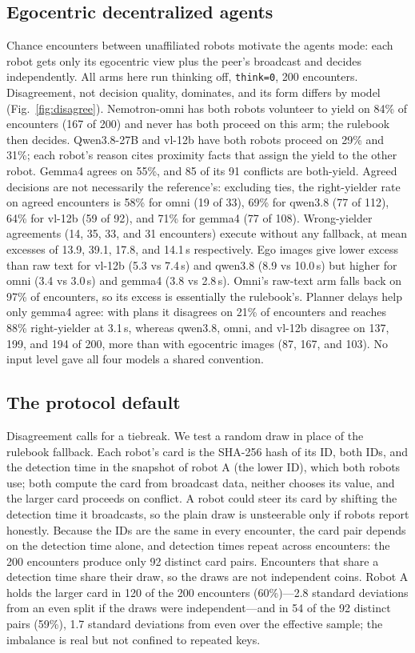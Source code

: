\documentclass[journal]{IEEEtran}
\begin{document}
\subsection{Egocentric decentralized agents}
\label{sec:ego}
Chance encounters between unaffiliated robots motivate the agents mode: each robot gets only its egocentric view plus the peer's broadcast and decides independently. All arms here run thinking off, \texttt{think=0}, 200 encounters. Disagreement, not decision quality, dominates, and its form differs by model (Fig.~\ref{fig:disagree}). Nemotron-omni has both robots volunteer to yield on 84\% of encounters (167 of 200) and never has both proceed on this arm; the rulebook then decides. Qwen3.8-27B and vl-12b have both robots proceed on 29\% and 31\%; each robot's reason cites proximity facts that assign the yield to the other robot. Gemma4 agrees on 55\%, and 85 of its 91 conflicts are both-yield. Agreed decisions are not necessarily the reference's: excluding ties, the right-yielder rate on agreed encounters is 58\% for omni (19 of 33), 69\% for qwen3.8 (77 of 112), 64\% for vl-12b (59 of 92), and 71\% for gemma4 (77 of 108). Wrong-yielder agreements (14, 35, 33, and 31 encounters) execute without any fallback, at mean excesses of 13.9, 39.1, 17.8, and 14.1\,s respectively. %
Ego images give lower excess than raw text for vl-12b (5.3 vs 7.4\,s) and qwen3.8 (8.9 vs 10.0\,s) but higher for omni (3.4 vs 3.0\,s) and gemma4 (3.8 vs 2.8\,s). Omni's raw-text arm falls back on 97\% of encounters, so its excess is essentially the rulebook's. Planner delays help only gemma4 agree: with plans it disagrees on 21\% of encounters and reaches 88\% right-yielder at 3.1\,s, whereas qwen3.8, omni, and vl-12b disagree on 137, 199, and 194 of 200, more than with egocentric images (87, 167, and 103). No input level gave all four models a shared convention.
\subsection{The protocol default}
\label{sec:tiebreak}
Disagreement calls for a tiebreak. We test a random draw in place of the rulebook fallback. Each robot's card is the SHA-256 hash of its ID, both IDs, and the detection time in the snapshot of robot A (the lower ID), which both robots use; both compute the card from broadcast data, neither chooses its value, and the larger card proceeds on conflict. A robot could steer its card by shifting the detection time it broadcasts, so the plain draw is unsteerable only if robots report honestly. Because the IDs are the same in every encounter, the card pair depends on the detection time alone, and detection times repeat across encounters: the 200 encounters produce only 92 distinct card pairs. Encounters that share a detection time share their draw, so the draws are not independent coins. Robot A holds the larger card in 120 of the 200 encounters (60\%)---2.8 standard deviations from an even split if the draws were independent---and in 54 of the 92 distinct pairs (59\%), 1.7 standard deviations from even over the effective sample; the imbalance is real but not confined to repeated keys.
\end{document}
